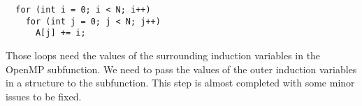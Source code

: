 {\footnotesize
\begin{lstlisting}
  for (int i = 0; i < N; i++)
    for (int j = 0; j < N; j++)
      A[j] += i;
\end{lstlisting}
}

Those loops need the values of the surrounding induction variables in the OpenMP subfunction. We need
to pass the values of the outer induction variables in a structure to the subfunction. This step is almost
completed with some minor issues to be fixed.

